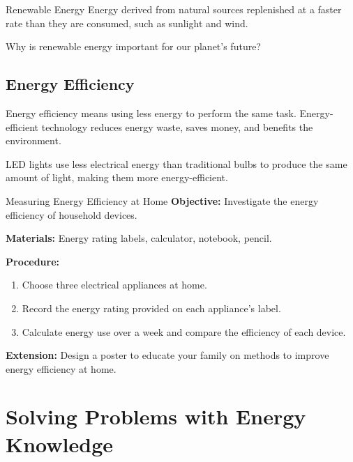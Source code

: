 \begin{keyconcept}{Renewable Energy}
Energy derived from natural sources replenished at a faster rate than they are consumed, such as sunlight and wind.
\end{keyconcept}


\begin{stopandthink}
Why is renewable energy important for our planet's future?
\end{stopandthink}

\subsection{Energy Efficiency}

Energy efficiency means using less energy to perform the same task. Energy-efficient technology reduces energy waste, saves money, and benefits the environment.

\begin{example}
LED lights use less electrical energy than traditional bulbs to produce the same amount of light, making them more energy-efficient.
\end{example}

\begin{investigation}{Measuring Energy Efficiency at Home}
\textbf{Objective:} Investigate the energy efficiency of household devices.

\textbf{Materials:} Energy rating labels, calculator, notebook, pencil.

\textbf{Procedure:}
\begin{enumerate}
\item Choose three electrical appliances at home.
\item Record the energy rating provided on each appliance's label.
\item Calculate energy use over a week and compare the efficiency of each device.
\end{enumerate}

\textbf{Extension:} Design a poster to educate your family on methods to improve energy efficiency at home.
\end{investigation}

\section{Solving Problems with Energy Knowledge}

